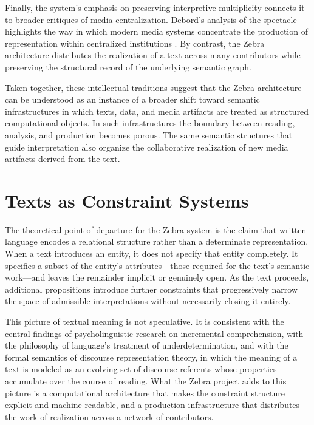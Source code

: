 \documentclass[12pt,a4paper]{article}
\begin{document}
Finally, the system’s emphasis on preserving interpretive multiplicity connects it to broader critiques of media centralization. Debord’s analysis of the spectacle highlights the way in which modern media systems concentrate the production of representation within centralized institutions \cite{debord1967}. By contrast, the Zebra architecture distributes the realization of a text across many contributors while preserving the structural record of the underlying semantic graph.

Taken together, these intellectual traditions suggest that the Zebra architecture can be understood as an instance of a broader shift toward semantic infrastructures in which texts, data, and media artifacts are treated as structured computational objects. In such infrastructures the boundary between reading, analysis, and production becomes porous. The same semantic structures that guide interpretation also organize the collaborative realization of new media artifacts derived from the text.

\section{Texts as Constraint Systems}

The theoretical point of departure for the Zebra system is the claim that written language encodes a relational structure rather than a determinate representation. When a text introduces an entity, it does not specify that entity completely. It specifies a subset of the entity's attributes—those required for the text's semantic work—and leaves the remainder implicit or genuinely open. As the text proceeds, additional propositions introduce further constraints that progressively narrow the space of admissible interpretations without necessarily closing it entirely.

This picture of textual meaning is not speculative. It is consistent with the central findings of psycholinguistic research on incremental comprehension, with the philosophy of language's treatment of underdetermination, and with the formal semantics of discourse representation theory, in which the meaning of a text is modeled as an evolving set of discourse referents whose properties accumulate over the course of reading. What the Zebra project adds to this picture is a computational architecture that makes the constraint structure explicit and machine-readable, and a production infrastructure that distributes the work of realization across a network of contributors.
\end{document}
